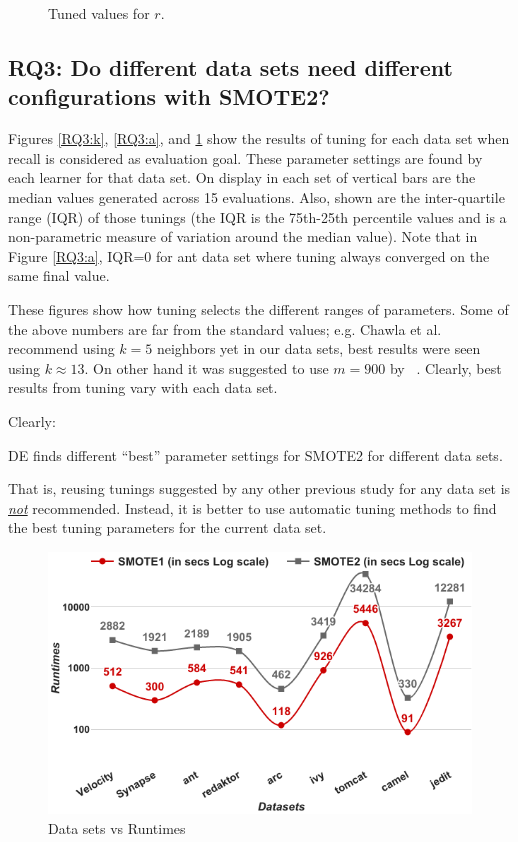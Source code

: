 \begin{figure}[!t]
\begin{minipage}{.33\textwidth}
        \caption{Tuned values for $r$.}
        \label{RQ3:b}
    \end{minipage}
\end{figure}

\subsection{\textbf{RQ3: Do different data sets
      need different configurations with SMOTE2?}}

Figures \ref{RQ3:k}, \ref{RQ3:a}, and \ref{RQ3:b} show the results of tuning for each data set when recall is considered as evaluation goal. These parameter settings are found by each learner for that data set.
On display in each set of vertical bars are
the median values generated across 15 evaluations.
Also, shown are
the inter-quartile range (IQR) of those tunings (the IQR is the 75th-25th percentile values and is a non-parametric measure of variation
around the median value). Note that in Figure \ref{RQ3:a}, IQR=0 for  ant data set where tuning
          always converged on the same final value.

  These figures
show how tuning selects the different ranges  of
parameters.
Some of the above numbers are far from the standard values; e.g. Chawla et al.~\cite{chawla2002smote} recommend using $k=5$ neighbors yet in our data sets, best results were seen using $k \approx 13$. On other hand it was suggested to use $m=900$ by ~\cite{pears2014synthetic}.
Clearly,
best results from tuning
vary with each data set.

Clearly:
\begin{lesson1}
    DE finds different ``best'' parameter settings for SMOTE2 for different data sets.
\end{lesson1}
 That is,  reusing tunings  suggested  by  any other  previous study  for any data set is \underline{{\em not}} recommended. Instead,  it is better to
      use  automatic  tuning  methods  to find the best tuning parameters for the current data set.
      

\begin{figure}[!t]
  \captionsetup{justification=centering}
  \includegraphics[width=\linewidth]{./fig/runtimes.png}
  \caption{Data sets vs Runtimes}
  \label{runtime}
\end{figure} 

